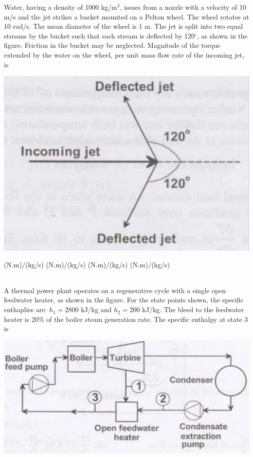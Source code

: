 \documentclass[addpoints,11pt]{exam}
\begin{document}
\begin{questions}
        \question Water, having a density of 1000 kg/m$^3$, issues from a nozzle with a velocity of 10 m/s and the jet strikes a bucket mounted on a Pelton wheel. The wheel rotates at 10 rad/s. The mean diameter of the wheel is 1 m. The jet is split into two equal streams by the bucket such that each stream is deflected by 120$^\circ$, as shown in the figure. Friction in the bucket may be neglected. Magnitude of the torque extended by the water on the wheel, per unit mass flow rate of the incoming jet, is

        \begin{center}
            \includegraphics[scale=0.3]{q51}
        \end{center}

        \begin{oneparchoices}
             (N.m)/(kg/s)
             (N.m)/(kg/s)
             (N.m)/(kg/s)
             (N.m)/(kg/s)
        \end{oneparchoices}\\

        \question A thermal power plant operates on a regenerative cycle with a single open feedwater heater, as shown in the figure. For the state points shown, the specific enthaplies are: $h_1 = 2800$ kJ/kg and $h_2 = 200$ kJ/kg. The bleed to the feedwater heater is 20\% of the boiler steam generation rate. The specific enthalpy at state 3 is

        \begin{center}
            \includegraphics[scale=0.3]{q52}
        \end{center}


\end{questions}
\end{document}
